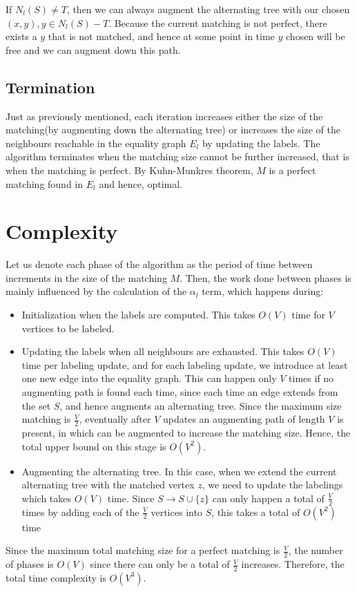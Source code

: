 \documentclass{article}
\begin{document}
If $N_l(S) \neq T$, then we can always augment the alternating tree with our chosen $(x, y), y\in N_l(S) - T$. Because the current matching is not perfect, there exists a $y$ that is not matched, and hence at some point in time $y$ chosen will be free and we can augment down this path.

\subsection{Termination}

Just as previously mentioned, each iteration increases either the size of the matching(by augmenting down the alternating tree) or increases the size of the neighbours reachable in the equality graph $E_l$ by updating the labels. The algorithm terminates when the matching size cannot be further increased, that is when the matching is perfect. By Kuhn-Munkres theorem, $M$ is a perfect matching found in $E_l$ and hence, optimal.

\section{Complexity}
Let us denote each phase of the algorithm as the period of time between increments in the size of the matching $M$. Then, the work done between phases is mainly influenced by the calculation of the $\alpha_l$ term, which happens during:
\begin{itemize}
\item Initialization when the labels are computed. This takes $O(V)$ time for $V$ vertices to be labeled.
\item Updating the labels when all neighbours are exhausted. This takes $O(V)$ time per labeling update, and for each labeling update, we introduce at least one new edge into the equality graph. This can happen only $V$ times if no augmenting path is found each time, since each time an edge extends from the set $S$, and hence augments an alternating tree. Since the maximum size matching is $\frac{V}{2}$, eventually after $V$ updates an augmenting path of length $V$ is present, in which can be augmented to increase the matching size. Hence, the total upper bound on this stage is $O(V^2)$.
\item Augmenting the alternating tree. In this case, when we extend the current alternating tree with the matched vertex $z$, we need to update  the labelings which takes $O(V)$ time. Since $S \rightarrow S \cup \{ z\}$ can only happen a total of $\frac{V}{2}$ times by adding each of the $\frac{V}{2}$ vertices into $S$, this takes a total of $O(V^2)$ time
\end{itemize} 

Since the maximum total matching size for a perfect matching is $\frac{V}{2}$, the number of phases is $O(V)$ since there can only be a total of $\frac{V}{2}$ increases. Therefore, the total time complexity is $O(V^3)$.
\end{document}
